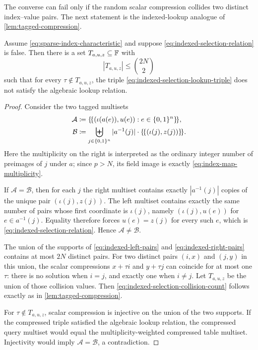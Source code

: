 The converse can fail only if the random scalar compression collides two distinct index--value pairs.  The next statement is the indexed-lookup analogue of \cref{lem:tagged-compression}.

\begin{lemma}
\label{lem:indexed-selection-compression}
Assume \eqref{eq:sparse-index-characteristic} and suppose \eqref{eq:indexed-selection-relation} is false.  Then there is a set $T_{a,u,z}\subseteq\mathbb{F}$ with
\begin{equation}
  |T_{a,u,z}|
  \le\binom{2N}{2}
  \label{eq:indexed-selection-collision-count}
\end{equation}
such that for every $\tau\notin T_{a,u,z}$, the triple \eqref{eq:indexed-selection-lookup-triple} does not satisfy the algebraic lookup relation.
\end{lemma}

\begin{proof}
Consider the two tagged multisets
\begin{align}
  \mathcal A
  &\coloneqq
  \{\!\{(\iota(a(e)),u(e)):e\in\{0,1\}^n\}\!\},
  \label{eq:indexed-left-pairs}\\
  \mathcal B
  &\coloneqq
  \biguplus_{j\in\{0,1\}^n}
  |a^{-1}(j)|\cdot\{\!\{(\iota(j),z(j))\}\!\}.
  \label{eq:indexed-right-pairs}
\end{align}
Here the multiplicity on the right is interpreted as the ordinary integer number of preimages of $j$ under $a$; since $p>N$, its field image is exactly \eqref{eq:index-map-multiplicity}.

If $\mathcal A=\mathcal B$, then for each $j$ the right multiset contains exactly $|a^{-1}(j)|$ copies of the unique pair $(\iota(j),z(j))$.  The left multiset contains exactly the same number of pairs whose first coordinate is $\iota(j)$, namely $(\iota(j),u(e))$ for $e\in a^{-1}(j)$.  Equality therefore forces $u(e)=z(j)$ for every such $e$, which is \eqref{eq:indexed-selection-relation}.  Hence $\mathcal A\ne\mathcal B$.

The union of the supports of \eqref{eq:indexed-left-pairs} and \eqref{eq:indexed-right-pairs} contains at most $2N$ distinct pairs.  For two distinct pairs $(i,x)$ and $(j,y)$ in this union, the scalar compressions $x+\tau i$ and $y+\tau j$ can coincide for at most one $\tau$: there is no solution when $i=j$, and exactly one when $i\ne j$.  Let $T_{a,u,z}$ be the union of those collision values.  Then \eqref{eq:indexed-selection-collision-count} follows exactly as in \cref{lem:tagged-compression}.

For $\tau\notin T_{a,u,z}$, scalar compression is injective on the union of the two supports.  If the compressed triple satisfied the algebraic lookup relation, the compressed query multiset would equal the multiplicity-weighted compressed table multiset.  Injectivity would imply $\mathcal A=\mathcal B$, a contradiction.
\end{proof}

